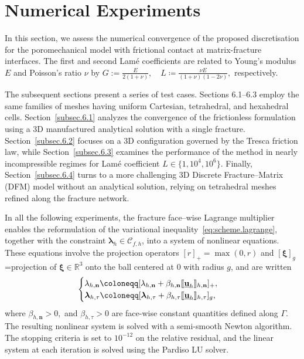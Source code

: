 \documentclass[a4paper,11pt]{article}
\theoremstyle{definition}
\theoremstyle{remark}
\newcommand{\uvec}[1]{\underline{\mathbf{#1}}}
\newcommand{\bo}[1]{\mathbf{#1}}
\newcommand{\bos}[1]{\boldsymbol{#1}}
\def\blambda{\boldsymbol{\lambda}}
\def\sjump#1{[\hskip -1.5pt[#1]\hskip -1.5pt]}
\begin{document}
\section{Numerical Experiments}\label{sec numerical}
In this section, we assess the numerical convergence of the proposed discretisation for the poromechanical model with frictional contact at matrix-fracture interfaces. The first and second Lam\'e coefficients are related to  Young's modulus $E$ and Poisson's ratio $\nu$ by
$G:= \frac{E}{2(1+\nu)}, \quad L \coloneqq \frac{\nu E}{(1+\nu)(1-2\nu)},$ respectively.

The subsequent sections present a series of test cases. Sections 6.1–6.3 employ the same families of meshes having uniform Cartesian, tetrahedral, and hexahedral cells. Section~\ref{subsec.6.1} analyzes the convergence of the frictionless formulation using a 3D manufactured analytical solution with a single fracture. Section~\ref{subsec.6.2} focuses on a 3D configuration governed by the Tresca friction law, while Section~\ref{subsec.6.3} examines the performance of the method in nearly incompressible regimes for Lam\'e coefficient $L\in\{1, 10^4, 10^6\}$. Finally, Section~\ref{subsec.6.4} turns to a more challenging 3D Discrete Fracture–Matrix (DFM) model without an analytical solution, relying on tetrahedral meshes refined along the fracture network.

In all the following experiments, the fracture face–wise Lagrange multiplier enables the reformulation of the variational inequality~\eqref{eq:scheme.lagrange}, together with the constraint $\boldsymbol{\lambda}_h \in \mathcal{C}_{f,h}$, into a system of nonlinear equations. These equations involve the projection operators $[r]_{+} = \max(0, r)$ and $[\bos{\xi}]_g$=projection of $\bos{\xi} \in \mathbb{R}^3$ onto the ball centered at $0$ with radius $g$, and are written
\begin{align*}
\begin{cases}
\lambda_{h,\bo{n}}\coloneqq  [\lambda_{h,\bo{n}}+\beta_{h,\bo{n}}\sjump{\uvec{u}_h}_{h,\bo{n}}]_+,\\
\blambda_{h,\tau}\coloneqq [\blambda_{h,\tau}+\beta_{h,\tau}\sjump{\uvec{u}_h}_{h,\tau}]_g,
\end{cases}
\end{align*}
where $\beta_{h,\bo{n}}>0,$ and $\beta_{h,\tau}>0$ are face-wise constant quantities defined along $\Gamma$. The resulting nonlinear system is solved with a semi-smooth Newton algorithm. The stopping criteria is set to $10^{-12}$ on the relative residual, and the linear system at each iteration is solved using the Pardiso LU solver.
\end{document}

